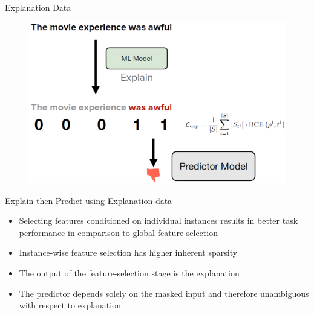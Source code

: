 \documentclass[11pt,compress,t,notes=noshow, aspectratio=169, xcolor=table]{beamer}
\begin{document}
\begin{frame}{Explanation Data}
    \begin{figure}
    \includegraphics[width=0.7\linewidth]{bild15}
    \end{figure}
\end{frame}

\begin{frame}{Explain then Predict using Explanation data}
\begin{itemize}
    \item Selecting features conditioned on individual instances results in better task performance in
comparison to global feature selection
    \bigskip
    \item Instance-wise feature selection has higher inherent sparsity
    \bigskip
    \item The output of the feature-selection stage is the explanation
    \bigskip
    \item The predictor depends solely on the masked input and therefore unambiguous with respect to
explanation
\end{itemize}
    
\end{frame}



\endlecture
\end{document}
